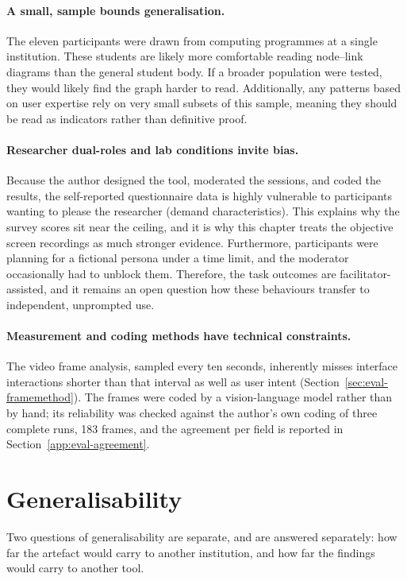 \paragraph{A small, sample bounds generalisation.} 
The eleven participants were drawn from computing programmes at a single institution. These students are likely more comfortable reading node--link diagrams than the general student body. If a broader population were tested, they would likely find the graph harder to read. Additionally, any patterns based on user expertise rely on very small subsets of this sample, meaning they should be read as indicators rather than definitive proof.

\paragraph{Researcher dual-roles and lab conditions invite bias.} 
Because the author designed the tool, moderated the sessions, and coded the results, the self-reported questionnaire data is highly vulnerable to participants wanting to please the researcher (demand characteristics). This explains why the survey scores sit near the ceiling, and it is why this chapter treats the objective screen recordings as much stronger evidence. Furthermore, participants were planning for a fictional persona under a time limit, and the moderator occasionally had to unblock them. Therefore, the task outcomes are facilitator-assisted, and it remains an open question how these behaviours transfer to independent, unprompted use.

\paragraph{Measurement and coding methods have technical constraints.}
The video frame analysis, sampled every ten seconds, inherently misses interface interactions shorter than that interval as well as user intent (Section~\ref{sec:eval-framemethod}). The frames were coded by a vision-language model rather than by hand; its reliability was checked against the author's own coding of three complete runs, 183 frames, and the agreement per field is reported in Section~\ref{app:eval-agreement}. 


\section{Generalisability}
\label{sec:disc-generalisability}

Two questions of generalisability are separate, and are answered separately: how far the artefact would carry to another institution, and how far the findings would carry to another tool.

